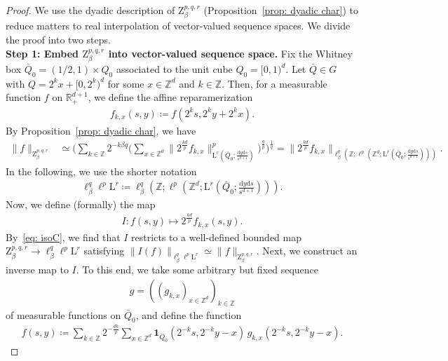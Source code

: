 \documentclass[11pt, leqno,parskip=half]{amsart}
\theoremstyle{definition}
\newcommand{\IR}{\mathbb{R}}
\newcommand{\IZ}{\mathbb{Z}}
\renewcommand{\L}{\mathrm{L}}
\newcommand{\Z}{\mathrm{Z}}
\renewcommand{\d}{\mathrm{d}}
\numberwithin{equation}{section}
\begin{document}
\begin{proof}
    We use the dyadic description of $\Z^{p,q,r}_{\beta}$ (Proposition~\ref{prop: dyadic char}) to reduce matters to real interpolation of vector-valued sequence spaces. We divide the proof into two steps.\\

    \noindent \textbf{Step 1: Embed $\Z^{p,q,r}_\beta$ into vector-valued sequence space.}
    Fix the Whitney box $\bar Q_0 = (1/2 , 1) \times Q_0$ associated to the unit cube $Q_0 = [0,1)^d$. Let $\bar Q \in G$ with $Q =2^kx+[0,2^k)^d$ for some $x\in \IZ^d$ and $k\in \IZ$. Then, for a measurable function $f$ on $\IR^{d+1}_+$, we define the affine reparamerization
    \begin{align*}
        f_{k,x}(s,y) \coloneqq f(2^ks , 2^ky +2^kx).
    \end{align*}
    By Proposition~\ref{prop: dyadic char}, we have
    \begin{align}
    \label{eq: isoC}
        \|f\|_{\Z^{p,q,r}_\beta}
        &\simeq \Big(\sum\limits_{k\in\IZ} 2^{-k\beta q}\Big(\sum\limits_{x\in\IZ^d} \|2^{\frac{kd}{p}} f_{k,x}\|_{\L^r(\bar Q_0; \frac{\d y \d s}{s^{d+1}})}^p\Big)^\frac{q}{p}\Big)^\frac{1}{q}
        =\big\| 2^\frac{kd}{p}f_{k,x} \big\|_{\ell^q_\beta(\IZ; \ell^p(\IZ^d; \L^r(\bar Q_0; \frac{\d y \d s}{s^{d+1}})))}.
    \end{align}
    In the following, we use the shorter notation
    \begin{align*}
        \ell^q_\beta\ell^p\L^r \coloneqq \ell^q_\beta(\IZ; \ell^p(\IZ^d; \L^r(\bar Q_0; \frac{\d y \d s}{s^{d+1}}))).
    \end{align*}
    Now, we define (formally) the map
    \begin{align}
    \label{eq: def I}
        I: f(s,y) \mapsto 2^{\frac{kd}{p}}f_{k,x}(s,y).
    \end{align}
    By~\eqref{eq: isoC}, we find that $I$ restricts to a well-defined bounded map $\Z^{p,q,r}_\beta \to\ell^q_\beta\ell^p\L^r$ satisfying $\|I(f)\|_{\ell^q_\beta\ell^p\L^r}\simeq \|f\|_{\Z^{p,q,r}_\beta}$.
    Next, we construct an inverse map to $I$. To this end, we take some arbitrary but fixed sequence
    \begin{align*}
        g =((g_{k,x})_{x\in\IZ^d})_{k\in\IZ}
    \end{align*}
    of measurable functions on $\bar Q_0$, and define the function
    \begin{align*}
        f(s,y) \coloneqq \sum\limits_{k\in\IZ} 2^{-\frac{dk}{p}}\sum\limits_{x\in\IZ^d} \mathbf{1}_{\bar Q_0}(2^{-k}s,2^{-k}y-x) \, g_{k,x}(2^{-k}s,2^{-k}y- x).

\end{align*}
\end{proof}
\end{document}
